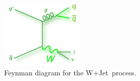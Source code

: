 \begin{itemize}
\begin{figure}[ht]
 \begin{center}
 \captionsetup[subfloat]{farskip=0pt,captionskip=0.0cm,labelformat=empty}
 \includegraphics[clip,width=0.35\textwidth]{figuras/Chapter4/Background2}
 \caption{
  Feynman diagram for the W$+$Jet~process.
   }
 \label{fig:WJets}
\end{center}
\end{figure}







\end{itemize}
